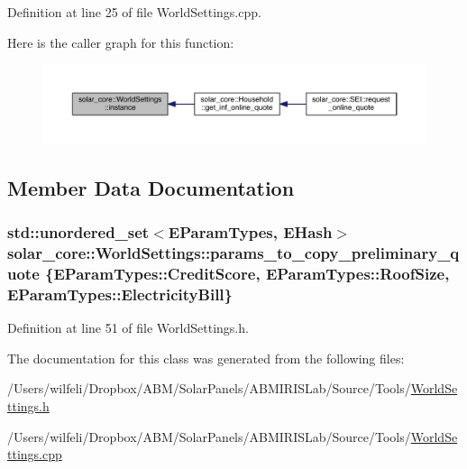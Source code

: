 Definition at line 25 of file World\+Settings.\+cpp.



Here is the caller graph for this function\+:
\nopagebreak
\begin{figure}[H]
\begin{center}
\leavevmode
\includegraphics[width=350pt]{classsolar__core_1_1_world_settings_a719e11b52a0e087f8c0dd11d9f65da88_icgraph}
\end{center}
\end{figure}




\subsection{Member Data Documentation}
\hypertarget{classsolar__core_1_1_world_settings_a728f0b1c11f8ec1816d269aedc1cd80e}{}
\subsubsection[{params\+\_\+to\+\_\+copy\+\_\+preliminary\+\_\+quote}]{\setlength{\rightskip}{0pt plus 5cm}std\+::unordered\+\_\+set$<${\bf E\+Param\+Types}, {\bf E\+Hash}$>$ solar\+\_\+core\+::\+World\+Settings\+::params\+\_\+to\+\_\+copy\+\_\+preliminary\+\_\+quote \{{\bf E\+Param\+Types\+::\+Credit\+Score}, {\bf E\+Param\+Types\+::\+Roof\+Size}, {\bf E\+Param\+Types\+::\+Electricity\+Bill}\}}\label{classsolar__core_1_1_world_settings_a728f0b1c11f8ec1816d269aedc1cd80e}


Definition at line 51 of file World\+Settings.\+h.



The documentation for this class was generated from the following files\+:\begin{DoxyCompactItemize}
\item 
/\+Users/wilfeli/\+Dropbox/\+A\+B\+M/\+Solar\+Panels/\+A\+B\+M\+I\+R\+I\+S\+Lab/\+Source/\+Tools/\hyperlink{_world_settings_8h}{World\+Settings.\+h}\item 
/\+Users/wilfeli/\+Dropbox/\+A\+B\+M/\+Solar\+Panels/\+A\+B\+M\+I\+R\+I\+S\+Lab/\+Source/\+Tools/\hyperlink{_world_settings_8cpp}{World\+Settings.\+cpp}\end{DoxyCompactItemize}
